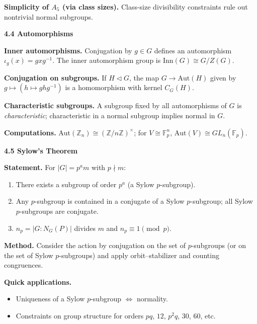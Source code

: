\documentclass[11pt]{article}
\theoremstyle{definition}
\newcommand{\Aut}{\mathrm{Aut}}
\newcommand{\Inn}{\mathrm{Inn}}
\begin{document}
\medskip
\textbf{Simplicity of $A_5$ (via class sizes).} Class-size divisibility constraints rule out nontrivial normal subgroups.

\newpage

\textbf{4.4 Automorphisms}

\newpage

\medskip
\textbf{Inner automorphisms.} Conjugation by $g\in G$ defines an automorphism $\iota_g(x)=gxg^{-1}$. The inner automorphism group is $\Inn(G)\cong G/Z(G)$.

\medskip
\textbf{Conjugation on subgroups.} If $H\lhd G$, the map $G\to\Aut(H)$ given by $g\mapsto (h\mapsto ghg^{-1})$ is a homomorphism with kernel $C_G(H)$.

\medskip
\textbf{Characteristic subgroups.} A subgroup fixed by all automorphisms of $G$ is \emph{characteristic}; characteristic in a normal subgroup implies normal in $G$.

\medskip
\textbf{Computations.} $\Aut(\mathbb{Z}_n)\cong (\mathbb{Z}/n\mathbb{Z})^\times$; for $V\cong \mathbb{F}_p^n$, $\Aut(V)\cong GL_n(\mathbb{F}_p)$.

\newpage

\textbf{4.5 Sylow’s Theorem}

\newpage

\medskip
\textbf{Statement.} For $|G|=p^a m$ with $p\nmid m$:
\begin{enumerate}\itemsep3pt
\item There exists a subgroup of order $p^a$ (a Sylow $p$-subgroup).
\item Any $p$-subgroup is contained in a conjugate of a Sylow $p$-subgroup; all Sylow $p$-subgroups are conjugate.
\item $n_p=|G:N_G(P)|$ divides $m$ and $n_p\equiv 1\pmod p$.
\end{enumerate}

\medskip
\textbf{Method.} Consider the action by conjugation on the set of $p$-subgroups (or on the set of Sylow $p$-subgroups) and apply orbit--stabilizer and counting congruences.

\medskip
\textbf{Quick applications.}
\begin{itemize}\itemsep3pt
\item Uniqueness of a Sylow $p$-subgroup $\Longleftrightarrow$ normality.
\item Constraints on group structure for orders $pq$, $12$, $p^2q$, $30$, $60$, etc.
\end{itemize}

\newpage
\end{document}
